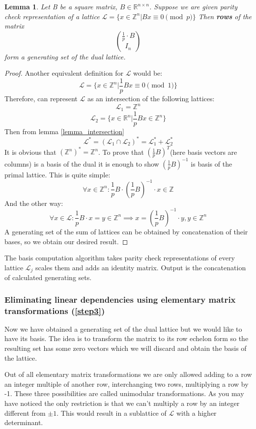 \documentclass[12pt]{article}
\newcommand{\ZZ}{\mathbb{Z}}
\newcommand{\LL}{\mathcal{L}}
\newtheorem{lemma}{Lemma}
\begin{document}
\begin{lemma}\label{lemma:dual_gen_set}
    Let B be a square matrix, $B \in \mathbb{R}^{n \times n}$. Suppose we are given parity check representation of a lattice $\LL = \{x \in \ZZ^{n} | Bx \equiv 0 \pmod{p}\}$
    Then \textbf{rows} of the matrix
    \[
    \binom{\frac{1}{p} \cdot B}{I_{n}}
    \]
    form a generating set of the dual lattice.
\end{lemma}
\begin{proof}
    Another equivalent definition for $\LL$ would be:
    \[
        \LL  = \{x \in \ZZ^{n} | \frac{1}{p}Bx \equiv 0 \pmod{1}\}
    \]
Therefore, can represent $\LL$ as an intersection of the following lattices:
\[
    \LL_{1}  = \ZZ^{n}
\]
\[
    \LL_{2}  = \{x \in \mathbb{R}^{n} | \frac{1}{p}Bx \in \ZZ^{n} \}
\]
Then from lemma \ref{lemma_intersection}
\[
    \LL^{*}  = (\LL_{1} \cap \LL_{2})^{*} = \LL_{1}^{*} + \LL_{2}^{*}
\]
It is obvious that $(\ZZ^{n})^{*} = \ZZ^{n}$. To prove that $(\frac{1}{p}B)^{T}$(here basis vectors are columns) is a basis of the dual it is enough to show $(\frac{1}{p}B)^{-1}$ is basis of the primal lattice. This is quite simple:
\[
    \forall x \in \ZZ^{n}: \frac{1}{p}B \cdot (\frac{1}{p}B)^{-1} \cdot x \in \ZZ
\]
And the other way:
\[
    \forall x \in \LL: \frac{1}{p}B \cdot x = y \in \ZZ^{n} \implies x = (\frac{1}{p}B)^{-1} \cdot y , y \in \ZZ^{n}
\]
A generating set of the sum of lattices can be obtained by concatenation of their bases, so we obtain our desired result.
\end{proof}

The basis computation algorithm takes parity check representations of every lattice $\LL_{j}$ scales them and adds an identity matrix. Output is the concatenation of calculated generating sets.

\subsubsection{Eliminating linear dependencies using elementary matrix transformations (\ref{step3})}
\label{subsubsec:hermite_form}
Now we have obtained a generating set of the dual lattice but we would like to have its basis. The idea is to transform the matrix to its row echelon form so the resulting set has some zero vectors which we will discard and obtain the basis of the lattice.

Out of all elementary matrix transformations we are only allowed adding to a row an integer multiple of another row, interchanging two rows, multiplying a row by -1. These three possibilities are called unimodular transformations. As you may have noticed the only restriction is that we can't multiply a row by an integer different from $\pm 1$. This would result in a sublattice of $\LL$ with a higher determinant.
\end{document}
